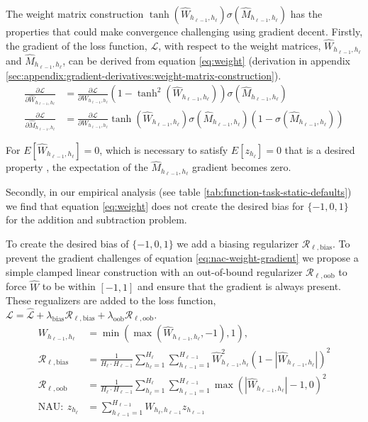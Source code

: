 The weight matrix construction $\tanh(\hat{W}_{h_{\ell-1},h_\ell}) \sigma(\hat{M}_{h_{\ell-1},h_\ell})$ has the properties that could make convergence challenging using gradient decent. Firstly, the gradient of the loss function, $\mathcal{L}$, with respect to the weight matrices, $\hat{W}_{h_{\ell-1},h_\ell}$ and $\hat{M}_{h_{\ell-1},h_\ell}$, can be derived from equation \ref{eq:weight} (derivation in appendix \ref{sec:appendix:gradient-derivatives:weight-matrix-construction}).
\begin{equation}
\begin{aligned}
\frac{\partial \mathcal{L}}{\partial \hat{W}_{h_{\ell-1},h_\ell}} &= \frac{\partial \mathcal{L}}{\partial W_{h_{\ell-1},h_\ell}} (1 - \tanh^2(\hat{W}_{h_{\ell-1},h_\ell})) \sigma(\hat{M}_{h_{\ell-1},h_\ell}) \\
\frac{\partial \mathcal{L}}{\partial \hat{M}_{h_{\ell-1},h_\ell}} &= \frac{\partial \mathcal{L}}{\partial W_{h_{\ell-1},h_\ell}} \tanh(\hat{W}_{h_{\ell-1},h_\ell}) \sigma(\hat{M}_{h_{\ell-1},h_\ell}) (1 - \sigma(\hat{M}_{h_{\ell-1},h_\ell}))
\end{aligned}
\label{eq:nac-weight-gradient}
\end{equation}

For $E[\hat{W}_{h_{\ell-1},h_\ell}] = 0$, which is necessary to satisfy $E[z_{h_\ell}]  = 0$ that is a desired property  \cite{glorot-initialization}, the expectation of the $\hat{M}_{h_{\ell-1},h_\ell}$ gradient becomes zero.

Secondly, in our empirical analysis (see table \ref{tab:function-task-static-defaults}) we find that equation \ref{eq:weight} does not create the desired bias for $\{-1, 0, 1\}$ for the addition and subtraction problem.

To create the desired bias of $\{-1, 0, 1\}$ we add a biasing regularizer $\mathcal{R}_{\ell,\mathrm{bias}}$. To prevent the gradient challenges of equation \ref{eq:nac-weight-gradient} we propose a simple clamped linear construction with an out-of-bound regularizer $\mathcal{R}_{\ell,\mathrm{oob}}$ to force $\hat{W}$ to be within $[-1, 1]$ and ensure that the gradient is always present. These regualizers are added to the loss function, $\mathcal{L} = \hat{\mathcal{L}} + \lambda_{\mathrm{bias}} \mathcal{R}_{\ell,\mathrm{bias}} + \lambda_{\mathrm{oob}} \mathcal{R}_{\ell,\mathrm{oob}}$.
\begin{align}
W_{h_{\ell-1},h_\ell} &= \min(\max(\hat{W}_{h_{\ell-1},h_\ell}, -1), 1), \\
\mathcal{R}_{\ell,\mathrm{bias}} &= \frac{1}{H_\ell \cdot H_{\ell-1}} \sum_{h_\ell=1}^{H_\ell} \sum_{h_{\ell-1}=1}^{H_{\ell-1}} \hat{W}_{h_{\ell-1},h_\ell}^2 (1 - |\hat{W}_{h_{\ell-1},h_\ell}|)^2 \\
\mathcal{R}_{\ell,\mathrm{oob}} &= \frac{1}{H_\ell \cdot H_{\ell-1}} \sum_{h_\ell=1}^{H_\ell} \sum_{h_{\ell-1}=1}^{H_{\ell-1}} \max(|\hat{W}_{h_{\ell-1},h_\ell}| - 1, 0)^2 \\
\textrm{NAU}:\ z_{h_\ell} &= \sum_{h_{\ell-1}=1}^{H_{\ell-1}} W_{h_{\ell}, h_{\ell-1}} z_{h_{\ell-1}}
\end{align}

